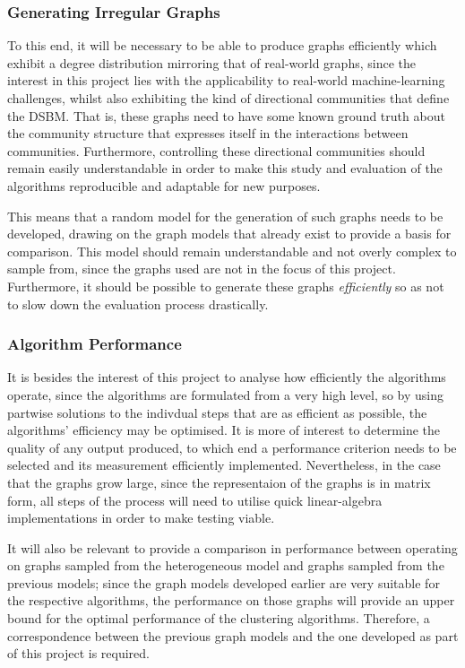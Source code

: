 \subsubsection{Generating Irregular Graphs}
To this end, it will be necessary to be able to produce graphs efficiently which exhibit a 
degree distribution mirroring that of real-world graphs, since the interest in this project lies 
with the applicability to real-world machine-learning challenges, whilst also exhibiting the kind 
of directional communities that define the DSBM. That is, these graphs need to have some known
ground truth about the community structure that expresses itself in the interactions between 
communities. Furthermore, controlling these directional communities should remain easily 
understandable in order to make this study and evaluation of the algorithms reproducible and 
adaptable for new purposes. 

This means that a random model for the generation of such graphs needs to be developed, drawing on
the graph models that already exist to provide a basis for comparison. This model should remain 
understandable and not overly complex to sample from, since the graphs used are not in the focus of
this project. Furthermore, it should be possible to generate these graphs \emph{efficiently} so as
not to slow down the evaluation process drastically.

\subsubsection{Algorithm Performance}
It is besides the interest of this project to analyse how efficiently the algorithms operate, since
the algorithms are formulated from a very high level, so by using partwise solutions to the 
indivdual steps that are as efficient as possible, the algorithms' efficiency may be optimised. 
It is more of interest to determine the quality of any output produced, to which end a performance
criterion needs to be selected and its measurement efficiently implemented. Nevertheless, in the case
that the graphs grow large, since the representaion of the graphs is in matrix form, all steps of the
process will need to utilise quick linear-algebra implementations in order to make testing viable.

It will also be relevant to provide a comparison in performance between operating on graphs sampled
from the heterogeneous model and graphs sampled from the previous models; since the graph models
developed earlier are very suitable for the respective algorithms, the performance on those graphs
will provide an upper bound for the optimal performance of the clustering algorithms. Therefore, 
a correspondence between the previous graph models and the one developed as part of this project 
is required.

